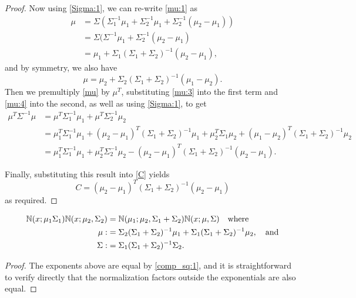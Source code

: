 \documentclass[12pt,leqno]{article}
\begin{document}
\begin{proof}
Now using \eqref{Sigma:1}, we can re-write \eqref{mu:1} as  
\begin{equation}\label{mu:3}
  \begin{split}
  \mu &= \Sigma(\Sigma_1^{-1}\mu_1 + \Sigma_2^{-1}\mu_1 +\Sigma_2^{-1}(\mu_2-\mu_1)) \\
  &= \Sigma(\Sigma^{-1}\mu_1 + \Sigma_2^{-1}(\mu_2-\mu_1) \\
  &= \mu_1 + \Sigma_1(\Sigma_1+\Sigma_2)^{-1}(\mu_2-\mu_1),
  \end{split}
  \end{equation}
and by symmetry, we also have 
\begin{equation}\label{mu:4}
  \mu = \mu_2 + \Sigma_2(\Sigma_1+\Sigma_2)^{-1}(\mu_1-\mu_2).
\end{equation}
Then we premultiply \eqref{mu} by $\mu^T$, substituting \eqref{mu:3} into the first term and
  \eqref{mu:4} into the second, as well as using \eqref{Sigma:1}, to get 
\begin{align*}
    \mu^T\Sigma^{-1}\mu &= \mu^T\Sigma_1^{-1}\mu_1 + \mu^T\Sigma_2^{-1}\mu_2 \\
    &= \mu_1^T\Sigma_1^{-1}\mu_1 + (\mu_2-\mu_1)^T(\Sigma_1+\Sigma_2)^{-1}\mu_1
    +\mu_2^T\Sigma_1\mu_2 + (\mu_1-\mu_2)^T(\Sigma_1+\Sigma_2)^{-1}\mu_2\\
    &= \mu_1^T\Sigma_1^{-1}\mu_1 + \mu_2^T\Sigma_2^{-1}\mu_2 - (\mu_2-\mu_1)^T(\Sigma_1+\Sigma_2)^{-1}(\mu_2-\mu_1).
\end{align*}

Finally, substituting this result into \eqref{C} yields
\begin{equation}\label{C:1}
  C = (\mu_2-\mu_1)^T(\Sigma_1+\Sigma_2)^{-1}(\mu_2-\mu_1)
\end{equation}
as required.
\end{proof}

\begin{Cor}\label{comp_sq:2}
\begin{align*}
  {\mathbb N}(x;\mu_1\Sigma_1){\mathbb N}(x;\mu_2,\Sigma_2) &= {\mathbb N}(\mu_1;\mu_2,\Sigma_1+\Sigma_2)
  {\mathbb N}(x;\mu,\Sigma) \quad\text{where}\\
 \mu :&= \Sigma_2(\Sigma_1+\Sigma_2)^{-1}\mu_1+\Sigma_1(\Sigma_1+\Sigma_2)^{-1}\mu_2, \quad\text{and}\\
 \Sigma :&= \Sigma_1(\Sigma_1 + \Sigma_2)^{-1}\Sigma_2.
\end{align*}
\begin{proof}
  The exponents above are equal by \eqref{comp_sq:1}, and it is
  straightforward to verify directly that the normalization factors outside the exponentials are also equal. 
\end{proof}
\end{Cor}
\end{document}
